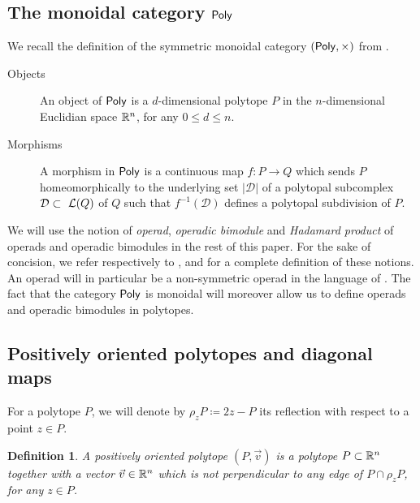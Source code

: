 \documentclass[10pt]{amsart}
\newtheorem{definition}{Definition}[section]
\theoremstyle{remark}
\begin{document}
 
\subsection{The monoidal category $\mathsf{Poly}$}

We recall the definition of the symmetric monoidal category $(\mathsf{Poly}, \times)$ from \cite[Section~2.1]{MTTV19}.
\begin{description}
\item[{\sc Objects}] An object of $\mathsf{Poly}$ is a $d$-dimensional  polytope $P$ in the $n$-dimensional Euclidian space $\mathbb{R}^n$, for any $0\leq d\leq n$.
\item[{\sc Morphisms}] A morphism in $\mathsf{Poly}$ is a continuous map  $f: P\to Q$ which sends  $P$ homeomorphically to the underlying set $|\mathcal{D}|$ of a polytopal subcomplex $\mathcal{D}\subset~\mathcal{L}(Q)$ of $Q$ 
such that $f^{-1}(\mathcal D)$ defines a polytopal subdivision of $P$.
\end{description}

We will use the notion of \textit{operad}, \textit{operadic bimodule} and \textit{Hadamard product} of operads and operadic bimodules in the rest of this paper. For the sake of concision, we refer respectively to \cite[Section 1.1.1]{mazuir-I}, \cite[Section 1.1.3]{mazuir-I} and \cite[Section 5.1.12]{LodayVallette12} for a complete definition of these notions. An operad will in particular be a non-symmetric operad in the language of \cite[Section 5.2.8]{LodayVallette12}. The fact that the category $\mathsf{Poly}$ is monoidal will moreover allow us to define operads and operadic bimodules in polytopes. 

\subsection{Positively oriented polytopes and diagonal maps}

For a polytope $P$, we will denote by $\rho_z P \coloneqq 2z-P$ its reflection with respect to a point $z \in P$. 

\begin{definition}
A \emph{positively oriented polytope} $(P, \vec v)$ is a polytope $P \subset \mathbb{R}^n$ together with a vector $\vec v\in \mathbb{R}^n$ which is not perpendicular to any edge of $P\cap \rho_z P$, for any $z \in P$.
\end{definition}
\end{document}
